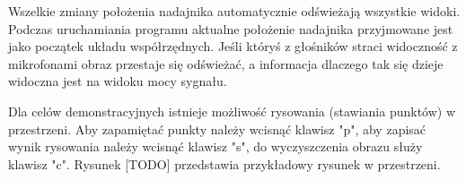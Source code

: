 Wszelkie zmiany położenia nadajnika automatycznie odświeżają wszystkie widoki. 
Podczas uruchamiania programu aktualne położenie nadajnika przyjmowane 
jest jako początek układu współrzędnych.
Jeśli któryś z głośników straci widoczność z mikrofonami obraz przestaje się odświeżać, a informacja dlaczego tak
się dzieje widoczna jest na widoku mocy sygnału.

Dla celów demonstracyjnych istnieje możliwość rysowania (stawiania punktów) w przestrzeni.
Aby zapamiętać punkty należy wcisnąć klawisz "p", aby zapisać wynik rysowania należy wcisnąć klawisz "s", do wyczyszczenia obrazu służy klawisz "c".
Rysunek [TODO] przedstawia przykładowy rysunek w przestrzeni.



